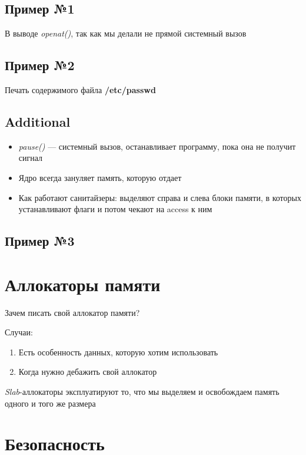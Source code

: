 \documentclass[../../lectures.tex]{subfiles}
\begin{document}
\subsection{Пример №1}
В выводе \emph{openat()}, так как мы делали не прямой системный вызов

\subsection{Пример №2}
Печать содержимого файла \textbf{/etc/passwd}

\subsection{Additional}
\begin{itemize}
    \item \emph{pause()} --- системный вызов, останавливает программу, пока она не получит сигнал

    \item Ядро всегда зануляет память, которую отдает

    \item Как работают санитайзеры: выделяют справа и слева блоки памяти, 
          в которых устанавливают флаги и потом чекают на access к ним
\end{itemize}

\subsection{Пример №3}


\section{Аллокаторы памяти}
Зачем писать свой аллокатор памяти?

Случаи:
\begin{enumerate}
    \item Есть особенность данных, которую хотим использовать
    \item Когда нужно дебажить свой аллокатор
\end{enumerate}
\emph{Slab}-аллокаторы эксплуатируют то, что мы выделяем и освобождаем память одного и того же размера

\section{Безопасность}
\end{document}
